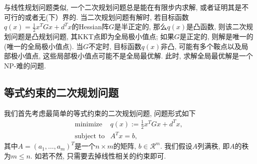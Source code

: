 \documentclass{SBCbookchapter}
\newcommand{\R}{\mathcal{R}}
\begin{document}
与线性规划问题类似, 一个二次规划问题总是能在有限步内求解, 或者证明其是不可行的或者无(下）界的. 当二次规划问题有解时, 若目标函数$q(x) = \frac{1}{2} x^T G x + d^T x$的Hessian阵$G$是半正定的, 那么$q(x)$是凸函数, 则该二次规划问题是凸规划问题, 其KKT点即为全局极小值点; 如果$G$是正定的, 则解是唯一的(唯一的全局极小值点). 当$G$不定时, 目标函数$q(x)$非凸, 可能有多个鞍点以及局部极小值点, 这些局部极小值点可能不是全局最优解. 此时, 求解全局最优解是一个NP-难的问题\cite{Murty_1987}.


\subsection{等式约束的二次规划问题}
\label{subsec:7.2.1}

我们首先考虑最简单的等式约束的二次规划问题, 问题形式如下
\begin{equation}
\label{eq:quadratic-programming-eq-constrained}
\begin{array}{cl}
\text{minimize} & q(x) := \frac{1}{2} x^T G x + d^T x, \\
\text{subject to} & A^T x = b,
\end{array}
\end{equation}
其中$A = (a_1, \ldots, a_m)^T$是一个$n \times m$的矩阵, $b\in \R^m.$ 我们假设$A$列满秩, 即$A$的秩为$m \leqslant n.$ 如若不然, 只需要去掉线性相关的约束即可.
\end{document}

